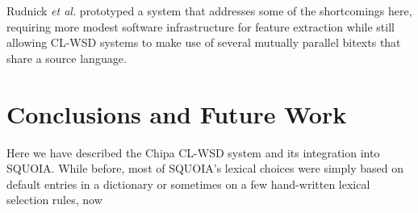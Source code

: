 \documentclass[10pt, a4paper]{article}
\begin{document}
Rudnick \emph{et al.} 
prototyped a system that addresses some of the shortcomings here, requiring
more modest software infrastructure for feature extraction while still allowing
CL-WSD systems to make use of several mutually parallel bitexts that share a
source language.

\section{Conclusions and Future Work}
Here we have described the Chipa CL-WSD system and its integration into SQUOIA.
While before, most of SQUOIA's lexical choices were simply based on default
entries in a dictionary or sometimes on a few hand-written lexical selection
rules, now 




\end{document}
